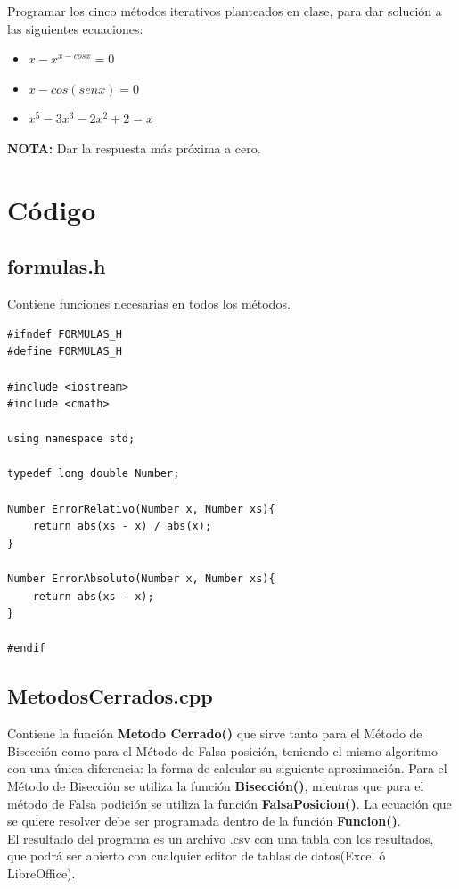 \documentclass[a4paper,12pt]{article}
\begin{document}
Programar los cinco métodos iterativos planteados en clase, para dar solución a las siguientes ecuaciones:

\begin{itemize}
 \item $x-x^{x-cosx} = 0$
 \item $x-cos(senx) = 0$
 \item $x^5 - 3x^3 - 2x^2 + 2 = x$
\end{itemize}

\textbf{NOTA: }Dar la respuesta más próxima a cero.

\section{Código}

  \subsection{formulas.h}
   
  Contiene funciones necesarias en todos los métodos.
  
  \begin{lstlisting}
#ifndef FORMULAS_H
#define FORMULAS_H

#include <iostream>
#include <cmath>

using namespace std;

typedef long double Number;

Number ErrorRelativo(Number x, Number xs){
	return abs(xs - x) / abs(x);
}

Number ErrorAbsoluto(Number x, Number xs){
	return abs(xs - x);
}

#endif
  \end{lstlisting}
  
  \subsection{MetodosCerrados.cpp}
  
  Contiene la función \textbf{Metodo Cerrado()} que sirve tanto para el Método de Bisección como para el Método
  de Falsa posición, teniendo el mismo algoritmo con una única diferencia: la forma de calcular su siguiente aproximación.
  Para el Método de Bisección se utiliza la función \textbf{Bisección()}, mientras que para el método de Falsa podición se 
  utiliza la función \textbf{FalsaPosicion()}. La ecuación que se quiere resolver debe ser programada dentro de la función
  \textbf{Funcion()}. \\
  El resultado del programa es un archivo .csv con una tabla con los resultados, que podrá 
  ser abierto con cualquier editor de tablas de datos(Excel ó LibreOffice).
  
\end{document}
